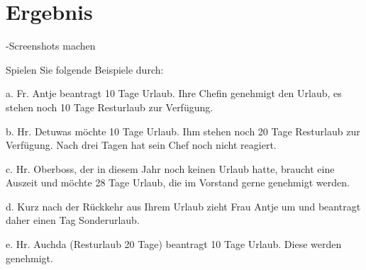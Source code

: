 \section{Ergebnis}
-Screenshots machen

Spielen Sie folgende Beispiele durch:


a. Fr. Antje beantragt 10 Tage Urlaub. Ihre Chefin genehmigt den Urlaub, es stehen noch 10
Tage Resturlaub zur Verfügung.


b. Hr. Detuwas möchte 10 Tage Urlaub. Ihm stehen noch 20 Tage Resturlaub zur Verfügung.
Nach drei Tagen hat sein Chef noch nicht reagiert.


c. Hr. Oberboss, der in diesem Jahr noch keinen Urlaub hatte, braucht eine Auszeit und möchte
28 Tage Urlaub, die im Vorstand gerne genehmigt werden.


d. Kurz nach der Rückkehr aus Ihrem Urlaub zieht Frau Antje um und beantragt daher einen Tag
Sonderurlaub.


e. Hr. Auchda (Resturlaub 20 Tage) beantragt 10 Tage Urlaub. Diese werden genehmigt.